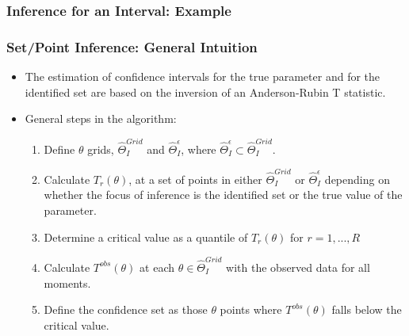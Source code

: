 \documentclass[10pt,letterpaper]{beamer}
\begin{document}
\begin{frame}
\frametitle{Inference for an Interval: Example}

\begin{figure}[h!]
\begin{center}
\end{center}
\end{figure}	
\end{frame}
\begin{frame}
\frametitle{Set/Point Inference: General Intuition}

\begin{itemize}
	\item The estimation of confidence intervals for the true parameter and for the identified set are based on the inversion of an Anderson-Rubin T statistic.
	\item General steps in the algorithm:
	\begin{enumerate}
		\item Define $\theta$ grids, $\widehat{\Theta}_{I}^{Grid}$ and $\widehat{\Theta}_{I}^{\epsilon}$, where $\widehat{\Theta}_{I}^{\epsilon}\subset 
\widehat{\Theta }_{I}^{Grid}$.
		\item Calculate $T_{r}(\theta)$, at a set of points in either $\widehat{\Theta }_{I}^{Grid}$ or $\widehat{\Theta}_{I}^{\epsilon}$ depending on whether the
focus of inference is the identified set or the true value of the parameter.
		\item Determine a critical value as a quantile of $T_{r}(\theta)$ for $r=1,...,R$
		\item Calculate $T^{obs}(\theta)$ at each $\theta\in\widehat{\Theta }_{I}^{Grid}$ with the observed data for all moments.
		\item Define the confidence set as those $\theta$ points where $T^{obs}(\theta)$ falls below the critical value.
	\end{enumerate}
\end{itemize}
\end{frame}
\end{document}
